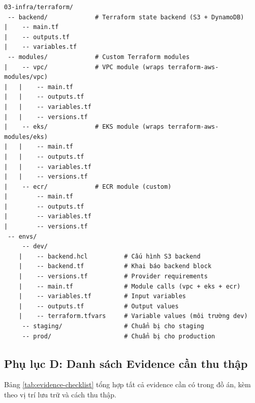 \documentclass[13pt,a4paper,twoside]{extarticle}
\begin{document}
\begin{verbatim}
03-infra/terraform/
 -- backend/             # Terraform state backend (S3 + DynamoDB)
|    -- main.tf
|    -- outputs.tf
|    -- variables.tf
 -- modules/             # Custom Terraform modules
|    -- vpc/             # VPC module (wraps terraform-aws-modules/vpc)
|   |    -- main.tf
|   |    -- outputs.tf
|   |    -- variables.tf
|   |    -- versions.tf
|    -- eks/             # EKS module (wraps terraform-aws-modules/eks)
|   |    -- main.tf
|   |    -- outputs.tf
|   |    -- variables.tf
|   |    -- versions.tf
|    -- ecr/             # ECR module (custom)
|        -- main.tf
|        -- outputs.tf
|        -- variables.tf
|        -- versions.tf
 -- envs/
     -- dev/
    |    -- backend.hcl          # Cấu hình S3 backend
    |    -- backend.tf           # Khai báo backend block
    |    -- versions.tf          # Provider requirements
    |    -- main.tf              # Module calls (vpc + eks + ecr)
    |    -- variables.tf         # Input variables
    |    -- outputs.tf           # Output values
    |    -- terraform.tfvars     # Variable values (môi trường dev)
     -- staging/                 # Chuẩn bị cho staging
     -- prod/                    # Chuẩn bị cho production
\end{verbatim}

\subsection*{Phụ lục D: Danh sách Evidence cần thu thập}

Bảng \ref{tab:evidence-checklist} tổng hợp tất cả evidence cần có trong đồ án, kèm theo vị trí lưu trữ và cách thu thập.
\end{document}
